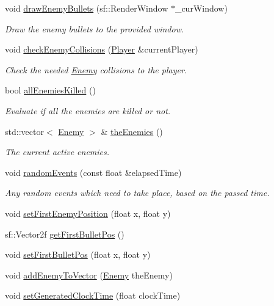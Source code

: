 \begin{DoxyCompactItemize}
void \hyperlink{class_enemy_manager_ae551aa23d45b17e6c9b3d5b12e39ab26}{draw\+Enemy\+Bullets} (sf\+::\+Render\+Window $\ast$\+\_\+cur\+Window)
\begin{DoxyCompactList}\small\item\em Draw the enemy bullets to the provided window. \end{DoxyCompactList}\item 
void \hyperlink{class_enemy_manager_a317b11ce52e67c7b760b2b81755fd95f}{check\+Enemy\+Collisions} (\hyperlink{class_player}{Player} \&current\+Player)
\begin{DoxyCompactList}\small\item\em Check the needed \hyperlink{class_enemy}{Enemy} collisions to the player. \end{DoxyCompactList}\item 
bool \hyperlink{class_enemy_manager_a9395ad36205c9653b4511859fb82179a}{all\+Enemies\+Killed} ()
\begin{DoxyCompactList}\small\item\em Evaluate if all the enemies are killed or not. \end{DoxyCompactList}\item 
std\+::vector$<$ \hyperlink{class_enemy}{Enemy} $>$ \& \hyperlink{class_enemy_manager_afee94a1383c9ec47a8a8ebb4fa4a2f7b}{the\+Enemies} ()
\begin{DoxyCompactList}\small\item\em The current active enemies. \end{DoxyCompactList}\item 
void \hyperlink{class_enemy_manager_abafa080764d42fbc020c33e48c7afb2f}{random\+Events} (const float \&elapsed\+Time)
\begin{DoxyCompactList}\small\item\em Any random events which need to take place, based on the passed time. \end{DoxyCompactList}\item 
void \hyperlink{class_enemy_manager_a5aacf80c75d457dfc2274c5f3be3ca96}{set\+First\+Enemy\+Position} (float x, float y)
\item 
sf\+::\+Vector2f \hyperlink{class_enemy_manager_a0632e71c86c73e74708d34df6d1fefba}{get\+First\+Bullet\+Pos} ()
\item 
void \hyperlink{class_enemy_manager_a217800f39e93529dc7c912857f5a4228}{set\+First\+Bullet\+Pos} (float x, float y)
\item 
void \hyperlink{class_enemy_manager_a73b9e07b84f4c25f88d09744aa373f3b}{add\+Enemy\+To\+Vector} (\hyperlink{class_enemy}{Enemy} the\+Enemy)
\item 
void \hyperlink{class_enemy_manager_a6258b25ccc4866129f9bfe176ee22c1f}{set\+Generated\+Clock\+Time} (float clock\+Time)
\end{DoxyCompactItemize}
